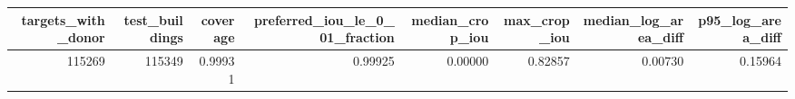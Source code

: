 \begin{tabular}{rrrrrrrr}
\toprule
targets\_with\_donor & test\_buildings & coverage & preferred\_iou\_le\_0\_01\_fraction & median\_crop\_iou & max\_crop\_iou & median\_log\_area\_diff & p95\_log\_area\_diff \\
\midrule
115269 & 115349 & 0.99931 & 0.99925 & 0.00000 & 0.82857 & 0.00730 & 0.15964 \\
\bottomrule
\end{tabular}
